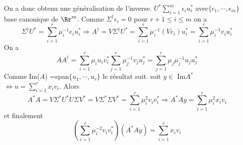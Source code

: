 {\begin{enumerate}
{On a donc obtenu une g\'en\'eralisation de l'inverse.
$U^*\sum_{i=1}^m \epsilon_iu_i^*$ avec$ \{\epsilon_1, \cdots , \epsilon_m\}$ base canonique de $\Rr^m$. Comme $\Sigma^{\dagger} \epsilon_i=0$ pour $r+1\leq i\leq m$ on a
$$\Sigma^{\dagger}U^*=\sum_{i=1}^r \mu_i^{-1}e_iu_i^* \Rightarrow A^{\dagger} =V\Sigma^{\dagger}U^* =\sum_{i=1}^r \mu_i^{-1}(Ve_i)u_i^* =\sum_{i=1}^r \mu_i^{-1}v_iu_i^*$$
On a
 $$AA^{\dagger} =\sum_{i=1}^r \mu_iu_iv_i^* \sum_{j=1}^r\mu_j^{-1}v_ju_j^*=\sum_{j=1}^r\mu_j\mu_j^{-1}u_ju_j^*$$
Comme Im($A$) =span$\{u_1,\cdots , u_r\}$ le r\'esultat suit.
soit $y\in$ Im$A^*$ $\Leftrightarrow u=\sum_{i=1}^r x_iv_i$. Alors
$$A^*A=V\Sigma^* U^*U\Sigma V^* =V\Sigma^*\Sigma V^*=\sum_{i=1}^r \mu_i^2 v_iv_i^*\Rightarrow A^*Ay=\sum_{i=1}^r \mu_i^2x_iv_i$$
et finalement
$$(\sum_{i=1}^r\mu_i^{-2}v_iv_i^*) (A^*Ay) =\sum_{i=1}^rx_iv_i$$
}
\end{enumerate}
}
